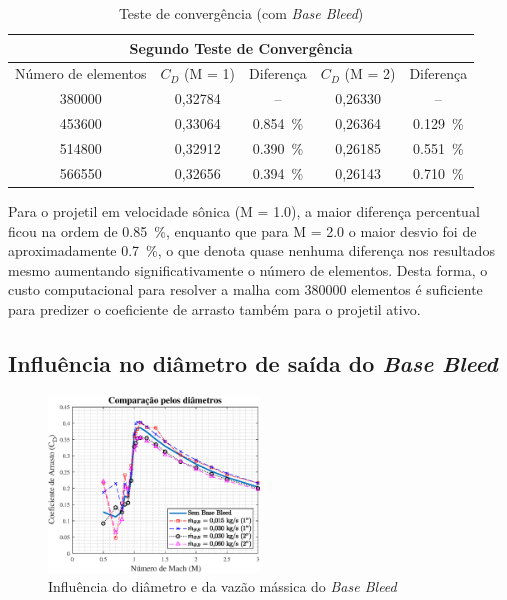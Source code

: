 \begin{table}[ht]
\centering
\caption[Teste de convergência (com \textit{Base Bleed})]{Teste de convergência (com \textit{Base Bleed})}
\vspace{0.5cm}
\begin{tabular}{c|c|c|c|c}
\multicolumn{5}{c}{Segundo Teste de Convergência} \\
\hline 
Número de elementos & \(C_{D}\) (M = \num{1}) & Diferença & \(C_{D}\) (M = \num{2}) & Diferença\\ 
\hline
\num{380000} & 0,32784 & -- & 0,26330 & --\\
\num{453600} & 0,33064 & \qty{0,854}{\percent} & 0,26364 & \qty{0,129}{\percent}\\
\num{514800} & 0,32912 & \qty{0,390}{\percent} & 0,26185 & \qty{0,551}{\percent}\\
\num{566550} & 0,32656 & \qty{0,394}{\percent} & 0,26143 & \qty{0,710}{\percent}\\
\end{tabular}
\label{tab:tabela-malhas-convergencia}
\end{table}

Para o projetil em velocidade sônica (M = \num{1,0}), a maior diferença percentual ficou na ordem de \qty{0,85}{\percent}, enquanto que para M = \num{2,0} o maior desvio foi de aproximadamente \qty{0,7}{\percent}, o que denota quase nenhuma diferença nos resultados mesmo aumentando significativamente o número de elementos. Desta forma, o custo computacional para resolver a malha com \num{380000} elementos é suficiente para predizer o coeficiente de arrasto também para o projetil ativo.

\subsection{Influência no diâmetro de saída do \textit{Base Bleed}} \label{subsec:resultados-com-basebleed-diametros}

\begin{figure}[!htpb]
	\centering
    \includegraphics[width=0.5\textwidth]{cd-combasebleed-diametro-1e2pol.eps}
	\caption{Influência do diâmetro e da vazão mássica do \textit{Base Bleed}}
	\label{fig:comparacao-bb-diametro-1e2pol}
\end{figure}

